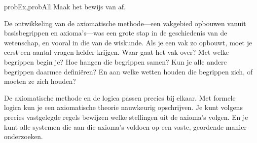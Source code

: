 \documentclass[openany]{memoir}
\begin{document}
\begin{probtag}{probEx,probAll}
  Maak het bewijs van  af.
\end{probtag} 
\endgroup
\OLEndChapterHook

\begingroup
\def\olfilename{OLP-0167}
\def\olfilepath{content/first-order-logic/models-theories/}
\hypertarget{unit-OLP-0167}{}



\endgroup

\begingroup
\def\olfilename{OLP-0168}
\def\olfilepath{content/first-order-logic/models-theories/}
\hypertarget{unit-OLP-0168}{}




\begin{explain}
De ontwikkeling van de axiomatische methode---een vakgebied opbouwen
vanuit basisbegrippen en axioma's---was een grote stap in de
geschiedenis van de wetenschap, en vooral in die van de wiskunde. Als
je een vak zo opbouwt, moet je eerst een aantal vragen helder krijgen.
Waar gaat het vak over? Met welke begrippen begin je? Hoe hangen die
begrippen samen? Kun je alle andere begrippen daarmee definiëren? En
aan welke wetten houden die begrippen zich, of moeten ze zich houden?

De axiomatische methode en de logica passen precies bij elkaar. Met
formele logica kun je een axiomatische theorie nauwkeurig opschrijven.
Je kunt volgens precies vastgelegde regels bewijzen welke stellingen
uit de axioma's volgen. En je kunt alle systemen die aan die axioma's
voldoen op een vaste, geordende manier onderzoeken.
\end{explain}
\end{document}
